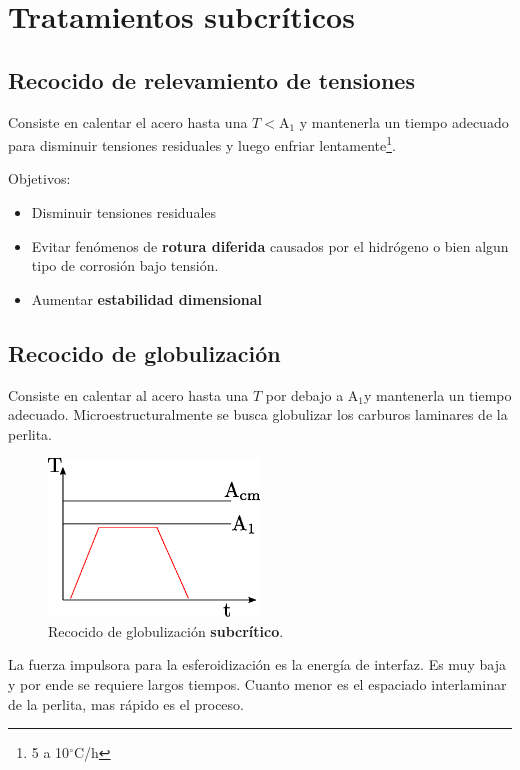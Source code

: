 \documentclass{article}
\newcommand{\Aone}{A\ensuremath{_{1}}}
\newcommand{\grad}{\ensuremath{^\circ \mathrm{C}}}
\begin{document}
\section{Tratamientos subcríticos}

\subsection{Recocido de relevamiento de tensiones}
Consiste en calentar el acero hasta una $T<$\Aone{} y mantenerla un tiempo adecuado para disminuir tensiones residuales y luego enfriar lentamente\footnote{5 a 10\grad/h}.

Objetivos:
\begin{itemize}
    \item Disminuir tensiones residuales
    \item Evitar fenómenos de \textbf{rotura diferida} causados por el hidrógeno o bien algun tipo de corrosión bajo tensión.
    \item Aumentar \textbf{estabilidad dimensional}
\end{itemize}

\subsection{Recocido de globulización}
Consiste en calentar al acero hasta una $T$ por debajo a \Aone y mantenerla un tiempo adecuado. Microestructuralmente se busca globulizar los carburos laminares de la perlita.

\begin{figure}[htb!]
    \centering
    \includegraphics[width=0.5\textwidth]{fig/TTglob.eps}
    \caption{Recocido de globulización \textbf{subcrítico}.}
    \label{fig:TTglob}
\end{figure}

La fuerza impulsora para la esferoidización es la energía de interfaz. Es muy baja y por ende se requiere largos tiempos. Cuanto menor es el espaciado interlaminar de la perlita, mas rápido es el proceso.
\end{document}

